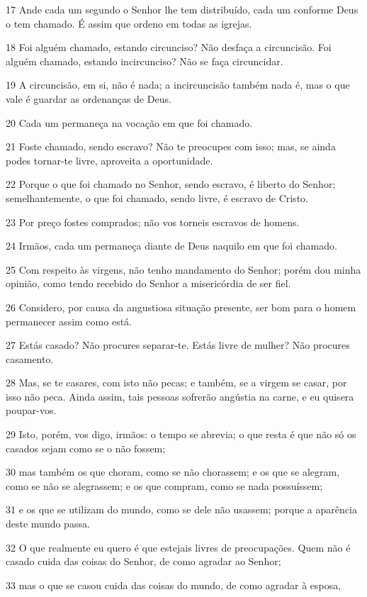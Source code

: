 \par 17 Ande cada um segundo o Senhor lhe tem distribuído, cada um conforme Deus o tem chamado. É assim que ordeno em todas as igrejas.
\par 18 Foi alguém chamado, estando circunciso? Não desfaça a circuncisão. Foi alguém chamado, estando incircunciso? Não se faça circuncidar.
\par 19 A circuncisão, em si, não é nada; a incircuncisão também nada é, mas o que vale é guardar as ordenanças de Deus.
\par 20 Cada um permaneça na vocação em que foi chamado.
\par 21 Foste chamado, sendo escravo? Não te preocupes com isso; mas, se ainda podes tornar-te livre, aproveita a oportunidade.
\par 22 Porque o que foi chamado no Senhor, sendo escravo, é liberto do Senhor; semelhantemente, o que foi chamado, sendo livre, é escravo de Cristo.
\par 23 Por preço fostes comprados; não vos torneis escravos de homens.
\par 24 Irmãos, cada um permaneça diante de Deus naquilo em que foi chamado.
\par 25 Com respeito às virgens, não tenho mandamento do Senhor; porém dou minha opinião, como tendo recebido do Senhor a misericórdia de ser fiel.
\par 26 Considero, por causa da angustiosa situação presente, ser bom para o homem permanecer assim como está.
\par 27 Estás casado? Não procures separar-te. Estás livre de mulher? Não procures casamento.
\par 28 Mas, se te casares, com isto não pecas; e também, se a virgem se casar, por isso não peca. Ainda assim, tais pessoas sofrerão angústia na carne, e eu quisera poupar-vos.
\par 29 Isto, porém, vos digo, irmãos: o tempo se abrevia; o que resta é que não só os casados sejam como se o não fossem;
\par 30 mas também os que choram, como se não chorassem; e os que se alegram, como se não se alegrassem; e os que compram, como se nada possuíssem;
\par 31 e os que se utilizam do mundo, como se dele não usassem; porque a aparência deste mundo passa.
\par 32 O que realmente eu quero é que estejais livres de preocupações. Quem não é casado cuida das coisas do Senhor, de como agradar ao Senhor;
\par 33 mas o que se casou cuida das coisas do mundo, de como agradar à esposa,

